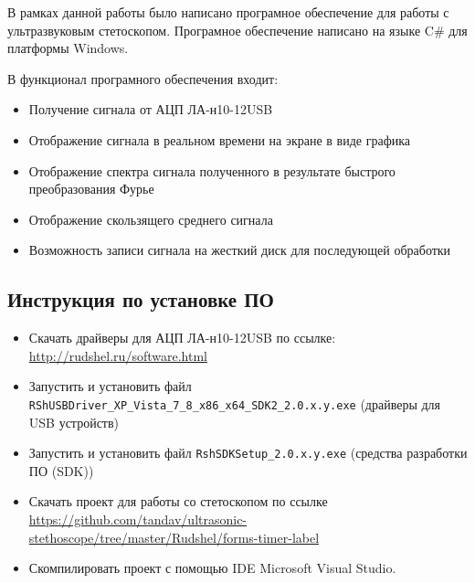 \documentclass[../paper.tex]{subfiles}
\begin{document}
В рамках данной работы было написано програмное обеспечение для работы с ультразвуковым стетоскопом. Програмное обеспечение написано на языке C\# для платформы Windows.

В функционал програмного обеспечения входит:
\begin{itemize}
  \item Получение сигнала от АЦП ЛА-н10-12USB
  \item Отображение сигнала в реальном времени на экране в виде графика
  \item Отображение спектра сигнала полученного в результате быстрого преобразования Фурье
  \item Отображение скользящего среднего сигнала
  \item Возможность записи сигнала на жесткий диск для последующей обработки
\end{itemize}

\subsection{Инструкция по установке ПО}
\begin{itemize}
  \item Скачать драйверы для АЦП ЛА-н10-12USB по ссылке:\\ \url{http://rudshel.ru/software.html}
  \item Запустить и установить файл \verb|RShUSBDriver_XP_Vista_7_8_x86_x64_SDK2_2.0.x.y.exe| (драйверы для USB устройств)
  \item Запустить и установить файл \verb|RshSDKSetup_2.0.x.y.exe| (средства разработки ПО (SDK))
  \item Скачать проект для работы со стетоскопом по ссылке \url{https://github.com/tandav/ultrasonic-stethoscope/tree/master/Rudshel/forms-timer-label}
  \item Скомпилировать проект с помощью IDE Microsoft Visual Studio.
\end{itemize}
\end{document}
